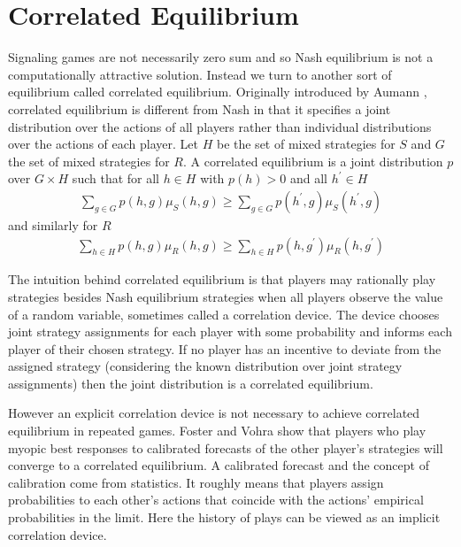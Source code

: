 \documentclass{article}
\begin{document}
\section{Correlated Equilibrium}

Signaling games are not necessarily zero sum and so Nash equilibrium is not a computationally attractive solution. Instead we turn to another sort of equilibrium called correlated equilibrium. Originally introduced by Aumann \cite{aumann1974subjectivity}\cite{aumann1987correlated}, correlated equilibrium is different from Nash in that it specifies a joint distribution over the actions of all players rather than individual distributions over the actions of each player. Let $H$ be the set of mixed strategies for $S$ and $G$ the set of mixed strategies for $R$. A correlated equilibrium is a joint distribution $p$ over $G \times H$ such that for all $h\in H$ with $p(h) > 0$ and all $h^\prime \in H$
\begin{align*}
\sum_{g \in G} p(h,g)\mu_S(h, g) \ge \sum_{g \in G} p(h^\prime,g)\mu_S(h^\prime, g)
\end{align*}
\noindent and similarly for $R$
\begin{align*}
\sum_{h \in H} p(h,g)\mu_R(h, g) \ge \sum_{h \in H} p(h,g^\prime)\mu_R(h, g^\prime)
\end{align*}

The intuition behind correlated equilibrium is that players may rationally play strategies besides Nash equilibrium strategies when all players observe the value of a random variable, sometimes called a correlation device. The device chooses joint strategy assignments for each player with some probability and informs each player of their chosen strategy. If no player has an incentive to deviate from the assigned strategy (considering the known distribution over joint strategy assignments) then the joint distribution is a correlated equilibrium.

However an explicit correlation device is not necessary to achieve correlated equilibrium in repeated games. Foster and Vohra \cite{foster1997calibrated} show that players who play myopic best responses to calibrated forecasts of the other player's strategies will converge to a correlated equilibrium. A calibrated forecast and the concept of calibration come from statistics. It roughly means that players assign probabilities to each other's actions that coincide with the actions' empirical probabilities in the limit. Here the history of plays can be viewed as an implicit correlation device.
\end{document}
